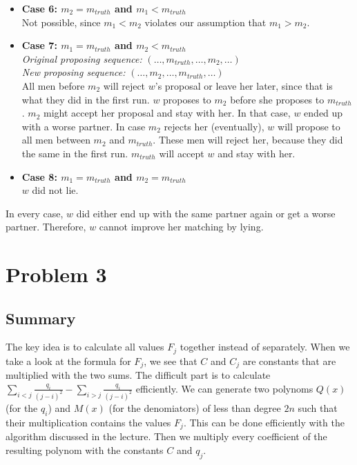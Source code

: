 \documentclass[12pt]{article}
\begin{document}
\begin{itemize}
	\item \textbf{Case 6: $m_2 = m_{\mathit{truth}}$ and $m_1 < m_{\mathit{truth}}$} \\ Not possible, since $m_1 < m_2$ violates our assumption that $m_1 > m_2$.
	\item \textbf{Case 7: $m_1 = m_{\mathit{truth}}$ and $m_2 < m_{\mathit{truth}}$} \\
\emph{Original proposing sequence:} $(\ldots, m_{\mathit{truth}}, \ldots, m_2, \ldots)$ \\
\emph{New proposing sequence:} $(\ldots, m_2, \ldots, m_{\mathit{truth}}, \ldots)$ \\
All men before $m_2$ will reject $w$'s proposal or leave her later, since that is what they did in the first run. $w$ proposes to $m_2$ before she proposes to $m_{\mathit{truth}}$. $m_2$ might accept her proposal and stay with her. In that case, $w$ ended up with a worse partner. In case $m_2$ rejects her (eventually), $w$ will propose to all men between $m_2$ and $m_{\mathit{truth}}$. These men will reject her, because they did the same in the first run. $m_{\mathit{truth}}$ will accept $w$ and stay with her.
	\item \textbf{Case 8: $m_1 = m_{\mathit{truth}}$ and $m_2 = m_{\mathit{truth}}$} \\ $w$ did not lie.
\end{itemize}

In every case, $w$ did either end up with the same partner again or get a worse partner. Therefore, $w$ cannot improve her matching by lying.

\section*{Problem 3}

\subsection*{Summary}
The key idea is to calculate all values $F_j$ together instead of separately. When we take a look at the formula for $F_j$, we see that $C$ and $C_j$ are constants that are multiplied with the two sums. The difficult part is to calculate $\sum_{i<j} \frac{q_i}{(j-i)^2} - \sum_{i>j} \frac{q_i}{(j-i)^2}$ efficiently. We can generate two polynoms $Q(x)$ (for the $q_i$) and $M(x)$ (for the denomiators) of less than degree $2n$ such that their multiplication contains the values $F_j$. This can be done efficiently with the algorithm discussed in the lecture. Then we multiply every coefficient of the resulting polynom with the constants $C$ and $q_j$.
\end{document}
